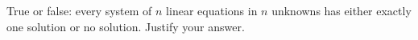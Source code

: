 True or false: every system of \(n\) linear equations in \(n\) unknowns has either exactly one solution or no solution. Justify your answer.
